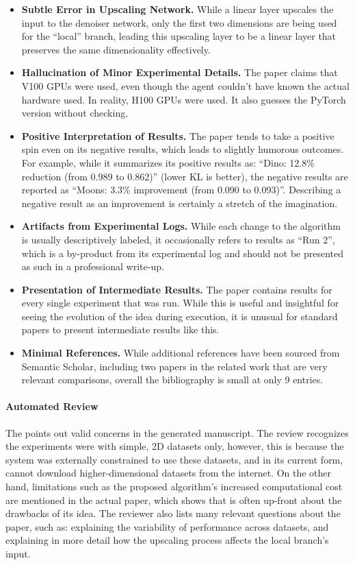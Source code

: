 \begin{appendices}
\begin{itemize}
    \item \textbf{Subtle Error in Upscaling Network.} While a linear layer upscales the input to the denoiser network, only the first two dimensions are being used for the ``local'' branch, leading this upscaling layer to be a linear layer that preserves the same dimensionality effectively.
    \item \textbf{Hallucination of Minor Experimental Details.} The paper claims that V100 GPUs were used, even though the agent couldn't have known the actual hardware used. In reality, H100 GPUs were used. It also guesses the PyTorch version without checking.
    \item \textbf{Positive Interpretation of Results.} The paper tends to take a positive spin even on its negative results, which leads to slightly humorous outcomes. For example, while it summarizes its positive results as: ``Dino: 12.8\% reduction (from 0.989 to 0.862)'' (lower KL is better), the negative results are reported as ``Moons: 3.3\% improvement (from 0.090 to 0.093)''. Describing a negative result as an improvement is certainly a stretch of the imagination.
    \item \textbf{Artifacts from Experimental Logs.} While each change to the algorithm is usually descriptively labeled, it occasionally refers to results as ``Run 2'', which is a by-product from its experimental log and should not be presented as such in a professional write-up.
    \item \textbf{Presentation of Intermediate Results.} The paper contains results for every single experiment that was run. While this is useful and insightful for seeing the evolution of the idea during execution, it is unusual for standard papers to present intermediate results like this.
    \item \textbf{Minimal References.} While additional references have been sourced from Semantic Scholar, including two papers in the related work that are very relevant comparisons, overall the bibliography is small at only 9 entries.
\end{itemize}

\paragraph{Automated Review} The \ourreviewer points out valid concerns in the generated manuscript. The review recognizes the experiments were with simple, 2D datasets only, however, this is because the system was externally constrained to use these datasets, and in its current form, \ouralgo cannot download higher-dimensional datasets from the internet. On the other hand, limitations such as the proposed algorithm's increased computational cost are mentioned in the actual paper, which shows that \ouralgo is often up-front about the drawbacks of its idea. The reviewer also lists many relevant questions about the paper, such as: explaining the variability of performance across datasets, and explaining in more detail how the upscaling process affects the local branch's input.


\end{appendices}
